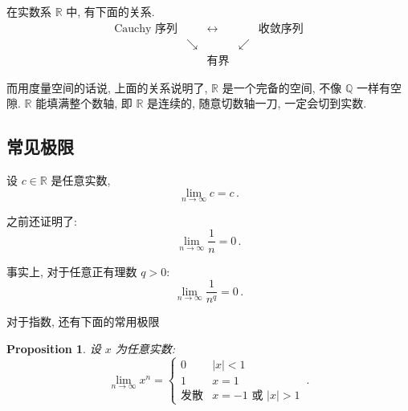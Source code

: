 \documentclass[UTF8]{ctexart}
\theoremstyle{mystyle}
\newtheorem{proposition}{Proposition}[section]
\theoremstyle{myremark}
\theoremstyle{plain}
\newcommand{\R}{\mathbb R}
\newcommand{\Q}{\mathbb Q}
\begin{document}
在实数系 $ \R $ 中, 有下面的关系.
\[ 
    \begin{matrix}
        \text{Cauchy 序列} & & \longleftrightarrow && \text{收敛序列} \\
        &\searrow & & \swarrow  & \\
        && \text{有界} &&
    \end{matrix}    
\]

而用度量空间的话说, 上面的关系说明了, $ \R $ 是一个完备的空间, 不像 $ \Q $ 一样有空隙. $ \R $ 能填满整个数轴, 即 $ \R $ 是连续的, 随意切数轴一刀, 一定会切到实数.


\subsection{常见极限}
设 $ c \in \R $ 是任意实数, \[ \lim_{n \to \infty} c = c \,.\]

之前还证明了: \[ \lim_{n \to \infty} \dfrac{1}{n} = 0 \,.\]

事实上, 对于任意正有理数 $ q > 0 $:
\[ \lim_{n \to \infty} \dfrac{1}{n^q} = 0 \,.\]


对于指数, 还有下面的常用极限
\begin{proposition} \label{common1}
    设 $ x $ 为任意实数:
    \[ 
        \lim_{n \to \infty} x^n = 
        \begin{cases}
            0 & |x| < 1 \\
            1 & x = 1 \\
            \text{发散} & x = -1 \text{ 或 } |x| > 1
        \end{cases}\,.
    \]
\end{proposition}
\end{document}
